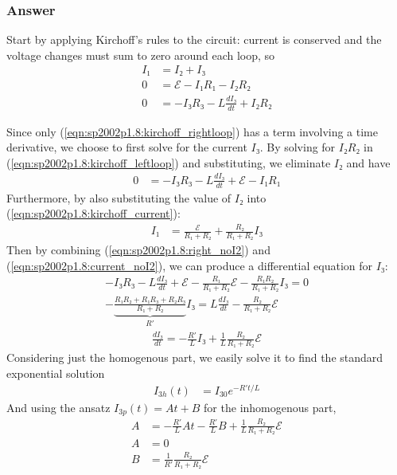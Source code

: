 \subsubsection{Answer}

Start by applying Kirchoff's rules to the circuit: current is conserved and
the voltage changes must sum to zero around each loop, so
\begin{align}
    I₁ &= I₂ + I₃
	\label{eqn:sp2002p1.8:kirchoff_current} \\
    0 &= \mathcal E - I₁R₁ - I₂R₂
	\label{eqn:sp2002p1.8:kirchoff_leftloop} \\
    0 &= -I₃R₃ - L \frac{dI₃}{dt} + I₂R₂
	\label{eqn:sp2002p1.8:kirchoff_rightloop}
\end{align}

Since only (\ref{eqn:sp2002p1.8:kirchoff_rightloop}) has a term involving
a time derivative, we choose to first solve for the current $I₃$. By solving
for $I₂R₂$ in (\ref{eqn:sp2002p1.8:kirchoff_leftloop}) and substituting,
we eliminate $I₂$ and have
\begin{align}
    0 &= -I₃R₃ - L\frac{dI₃}{dt} + \mathcal E - I₁R₁
    \label{eqn:sp2002p1.8:right_noI2}
\end{align}
Furthermore, by also substituting the value of $I₂$ into
(\ref{eqn:sp2002p1.8:kirchoff_current}):
\begin{align}
    I₁ &= \frac{\mathcal E}{R₁+R₂} + \frac{R₂}{R₁+R₂} I₃
    \label{eqn:sp2002p1.8:current_noI2}
\end{align}
Then by combining (\ref{eqn:sp2002p1.8:right_noI2}) and
(\ref{eqn:sp2002p1.8:current_noI2}), we can produce a differential equation
for $I₃$:
\begin{align*}
    -I₃R₃ - L\frac{dI₃}{dt} + \mathcal E - \frac{R₁}{R₁+R₂}\mathcal E -
	\frac{R₁R₂}{R₁+R₂}I₃ = 0
    \\
    -\underbrace{\frac{R₁R₂ + R₁R₃ + R₂R₃}{R₁+R₂}}_{R'}I₃ = L\frac{dI₃}{dt}
	- \frac{R₂}{R₁+R₂} \mathcal E
\end{align*}
\begin{align}
    \frac{dI₃}{dt} = -\frac{R'}{L} I₃ + \frac{1}{L}\frac{R₂}{R₁+R₂}\mathcal E
	\label{eqn:sp2002p1.8:diffeq_I3}
\end{align}
Considering just the homogenous part, we easily solve it to find the standard
exponential solution
\begin{align*}
    I_{3h}(t) &= I_{30} e^{-R't/L}
\end{align*}
And using the ansatz $I_{3p}(t) = At + B$ for the inhomogenous part,
\begin{align*}
    A &= -\frac{R'}{L}At - \frac{R'}{L}B + \frac 1L\frac{R₂}{R₁+R₂}\mathcal E
    \\
    A &= 0 \\
    B &= \frac{1}{R'}\frac{R₂}{R₁+R₂}\mathcal E
\end{align*}
